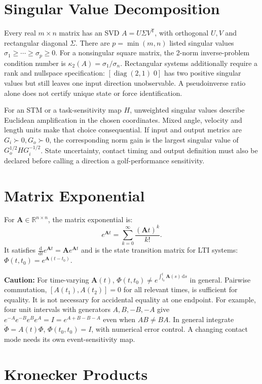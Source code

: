 \documentclass[10pt,letterpaper,openany]{book}
\theoremstyle{plain}
\theoremstyle{definition}
\theoremstyle{remark}
\renewcommand{\R}{\mathbb{R}}
\renewcommand{\dd}{\mathrm{d}}
\renewcommand{\T}{\mathsf{T}}   %
\renewcommand{\mat}[1]{\mathbf{#1}}
\begin{document}
\section{Singular Value Decomposition}

Every real $m\times n$ matrix has an SVD $A=U\Sigma V^\T$, with orthogonal
$U,V$ and rectangular diagonal $\Sigma$. There are $p=\min(m,n)$ listed singular
values $\sigma_1\geq\cdots\geq\sigma_p\geq0$. For a nonsingular square matrix,
the 2-norm inverse-problem condition number is $\kappa_2(A)=\sigma_1/\sigma_n$.
Rectangular systems additionally require a rank and nullspace specification:
$[\operatorname{diag}(2,1)\;0]$ has two positive singular values but still leaves
one input direction unobservable. A pseudoinverse ratio alone does not certify
unique state or force identification.

For an STM or a task-sensitivity map $H$, unweighted singular values describe
Euclidean amplification in the chosen coordinates. Mixed angle, velocity and
length units make that choice consequential. If input and output metrics are
$G_i\succ0,G_o\succ0$, the corresponding norm gain is the largest singular value
of $G_o^{1/2}HG_i^{-1/2}$. State uncertainty, contact timing and output definition
must also be declared before calling a direction a golf-performance sensitivity.

\section{Matrix Exponential}

For $\mat{A} \in \R^{n \times n}$, the matrix exponential is:
\[
e^{\mat{A}t} = \sum_{k=0}^\infty \frac{(\mat{A}t)^k}{k!}.
\]
It satisfies $\frac{\dd}{\dd t} e^{\mat{A}t} = \mat{A} e^{\mat{A}t}$ and is the state
transition matrix for LTI systems: $\Phi(t, t_0) = e^{\mat{A}(t-t_0)}$.

\textbf{Caution:} For time-varying $\mat{A}(t)$, $\Phi(t, t_0) \neq e^{\int_{t_0}^t \mat{A}(s)\,\dd s}$
in general. Pairwise commutation,
$[A(t_1),A(t_2)]=0$ for all relevant times, is sufficient for equality.
It is not necessary for accidental equality at one endpoint. For example, four
unit intervals with generators $A,B,-B,-A$ give
$e^{-A}e^{-B}e^Be^A=I=e^{A+B-B-A}$ even when $AB\ne BA$.
In general integrate $\dot\Phi=A(t)\Phi$, $\Phi(t_0,t_0)=I$, with numerical
error control. A changing contact mode needs its own event-sensitivity map.

\section{Kronecker Products}
\end{document}
